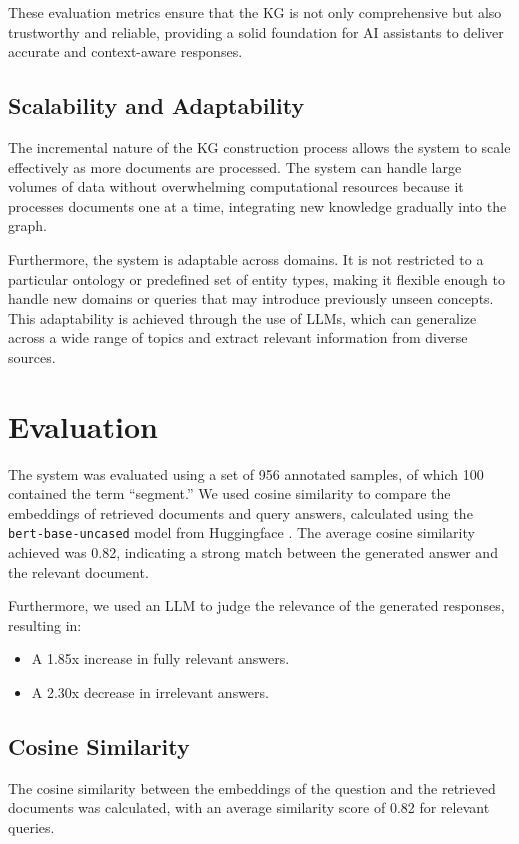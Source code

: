 These evaluation metrics ensure that the KG is not only comprehensive but also trustworthy and reliable, providing a solid foundation for AI assistants to deliver accurate and context-aware responses.

\subsection{Scalability and Adaptability}

The incremental nature of the KG construction process allows the system to scale effectively as more documents are processed. The system can handle large volumes of data without overwhelming computational resources because it processes documents one at a time, integrating new knowledge gradually into the graph.

Furthermore, the system is adaptable across domains. It is not restricted to a particular ontology or predefined set of entity types, making it flexible enough to handle new domains or queries that may introduce previously unseen concepts. This adaptability is achieved through the use of LLMs, which can generalize across a wide range of topics and extract relevant information from diverse sources.


\section{Evaluation}


The system was evaluated using a set of 956 annotated samples, of which 100 contained the term ``segment.'' We used cosine similarity to compare the embeddings of retrieved documents and query answers, calculated using the \texttt{bert-base-uncased} model from Huggingface \citep{bert}. The average cosine similarity achieved was 0.82, indicating a strong match between the generated answer and the relevant document.

Furthermore, we used an LLM to judge the relevance of the generated responses, resulting in:
\begin{itemize}
    \item A 1.85x increase in fully relevant answers.
    \item A 2.30x decrease in irrelevant answers.
\end{itemize}

\subsection{Cosine Similarity}
The cosine similarity between the embeddings of the question and the retrieved documents was calculated, with an average similarity score of 0.82 for relevant queries.

